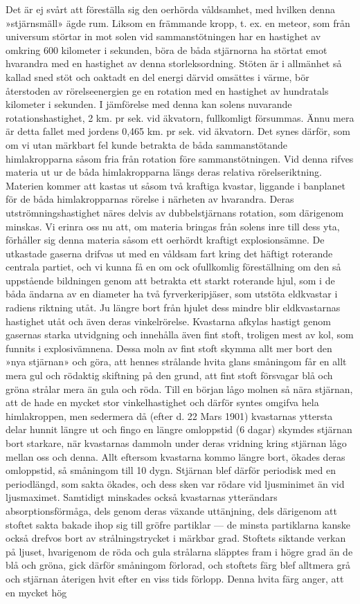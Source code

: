 \documentclass[a4paper, 12pt, oneside, swedish]{article}
\begin{document}
Det är ej svårt att föreställa sig den oerhörda våldsamhet, med hvilken denna »stjärnsmäll» ägde rum. Liksom en främmande kropp, t. ex. en meteor, som från universum störtar in mot solen vid sammanstötningen har en hastighet av omkring 600 kilometer i sekunden, böra de båda stjärnorna ha störtat emot hvarandra med en hastighet av denna storleksordning. Stöten är i allmänhet så kallad sned stöt och oaktadt en del energi därvid omsättes i värme, bör återstoden av rörelseenergien ge en rotation med en hastighet av hundratals kilometer i sekunden. I jämförelse med denna kan solens nuvarande rotationshastighet, 2 km. pr sek. vid äkvatorn, fullkomligt försummas. Ännu mera är detta fallet med jordens 0,465 km. pr sek. vid äkvatorn. Det synes därför, som om vi utan märkbart fel kunde betrakta de båda sammanstötande himlakropparna såsom fria från rotation före sammanstötningen. Vid denna rifves materia ut ur de båda himlakropparna längs deras relativa rörelseriktning. Materien kommer att kastas ut såsom två kraftiga kvastar, liggande i banplanet för de båda himlakropparnas rörelse i närheten av hvarandra. Deras utströmningshastighet näres delvis av dubbelstjärnans rotation, som därigenom minskas. Vi erinra oss nu att, om materia bringas från solens inre till dess yta, förhåller sig denna materia såsom ett oerhördt kraftigt explosionsämne. De utkastade gaserna drifvas ut med en våldsam fart kring det häftigt roterande centrala partiet, och vi kunna få en om ock ofullkomlig föreställning om den så uppstående bildningen genom att betrakta ett starkt roterande hjul, som i de båda ändarna av en diameter ha två fyrverkeripjäser, som utstöta eldkvastar i radiens riktning utåt. Ju längre bort från hjulet dess mindre blir eldkvastarnas hastighet utåt och även deras vinkelrörelse. Kvastarna afkylas hastigt genom gasernas starka utvidgning och innehålla även fint stoft, troligen mest av kol, som funnits i explosivämnena. Dessa moln av fint stoft skymma allt mer bort den »nya stjärnan» och göra, att hennes strålande hvita glans småningom får en allt mera gul och rödaktig skiftning på den grund, att fint stoft försvagar blå och gröna strålar mera än gula och röda. Till en början lågo molnen så nära stjärnan, att de hade en mycket stor vinkelhastighet och därför syntes omgifva hela himlakroppen, men sedermera då (efter d. 22 Mars 1901) kvastarnas yttersta delar hunnit längre ut och fingo en längre omloppstid (6 dagar) skymdes stjärnan bort starkare, när kvastarnas dammoln under deras vridning kring stjärnan lågo mellan oss och denna. Allt eftersom kvastarna kommo längre bort, ökades deras omloppstid, så småningom till 10 dygn. Stjärnan blef därför periodisk med en periodlängd, som sakta ökades, och dess sken var rödare vid ljusminimet än vid ljusmaximet. Samtidigt minskades också kvastarnas ytterändars absorptionsförmåga, dels genom deras växande uttänjning, dels därigenom att stoftet sakta bakade ihop sig till gröfre partiklar --- de minsta partiklarna kanske också drefvos bort av strålningstrycket i märkbar grad. Stoftets siktande verkan på ljuset, hvarigenom de röda och gula strålarna släpptes fram i högre grad än de blå och gröna, gick därför småningom förlorad, och stoftets färg blef alltmera grå och stjärnan återigen hvit efter en viss tids förlopp. Denna hvita färg anger, att en mycket hög 
\end{document}
